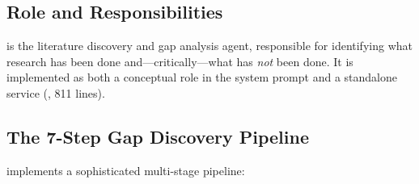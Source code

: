 \subsection{Role and Responsibilities}

\gauss is the literature discovery and gap analysis agent, responsible for identifying what research has been done and---critically---what has \emph{not} been done.
It is implemented as both a conceptual role in the system prompt and a standalone service (, 811 lines).

\subsection{The 7-Step Gap Discovery Pipeline}

\gauss implements a sophisticated multi-stage pipeline:

